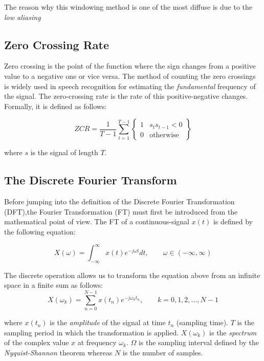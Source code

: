\noindent The reason why this windowing method is one of the most diffuse is due to the \textit{low aliasing}

\subsection{Zero Crossing Rate}
\label{ssubs:Zero Crossing Rate}
Zero crossing is the point of the function where the sign changes from a positive value to a negative one or vice versa. The method of counting the zero crossings is widely used in speech recognition for estimating the \textit{fundamental} frequency of the signal. The zero-crossing rate is the rate of this positive-negative changes. Formally, it is defined as follows:

\begin{equation}
ZCR = \frac{1}{T-1} \sum_{t=1}^{T-1} \begin{Bmatrix}
										1  & s_t s_{t-1} < 0 \\
										0 & \text{otherwise}
									 \end{Bmatrix}
\end{equation}

\noindent where $s$ is the signal of length $T$.

\subsection{The Discrete Fourier Transform}
\label{ssubs:discrete_fourier_transform}
Before jumping into the definition of the Discrete Fourier Transformation (DFT),the Fourier Transformation (FT) must first be introduced from the mathematical point of view. The FT of a continuous-signal $x(t)$ is defined by the following equation:

\begin{equation}
X(\omega) = \int_{-\infty}^\infty x(t)e^{-j\omega t} dt, \qquad \omega\in(-\infty,\infty)
\end{equation}

\noindent The discrete operation allows us to transform the equation above from an infinite space in a finite sum as follows:
\begin{equation}
X(\omega_k ) = \sum_{n=0}^{N-1}x(t_n)e^{-j\omega_k t_n}, \qquad k=0,1,2,\ldots,N-1
\end{equation}

\noindent where $x(t_n)$ is the \textit{amplitude} of the signal at time $t_n$ (sampling time). $T$ is the sampling period in which the transformation is applied. $X(\omega_k )$ is the \textit{spectrum} of the complex value $x$ at frequency $\omega_k$. $\Omega$ is the sampling interval defined by the \textit{Nyquist-Shannon} theorem whereas $N$ is the number of samples. \\

